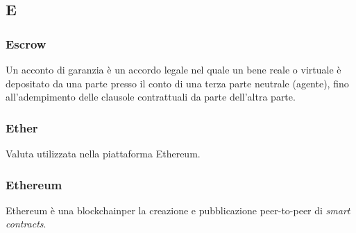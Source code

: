 \subsection*{\textbf{\hfill \Huge{E} \hfill}} 
\subsubsection*{Escrow}
Un acconto di garanzia è un accordo legale nel quale un bene reale o virtuale è depositato da una parte presso il conto di una terza parte neutrale (agente), fino all'adempimento delle clausole contrattuali da parte dell'altra parte.
\subsubsection*{Ether}
Valuta utilizzata nella piattaforma Ethereum.
\subsubsection*{Ethereum}
Ethereum è una blockchain\glo per la creazione e pubblicazione peer-to-peer di  \textit{smart contracts}\glos.
